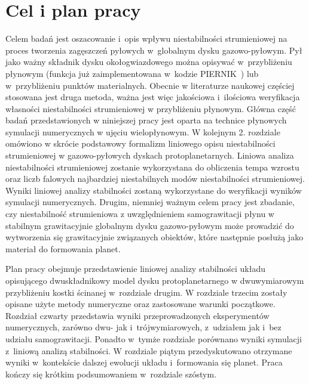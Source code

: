 \section{Cel i plan pracy}
Celem badań jest oszacowanie i~opis wpływu niestabilności strumieniowej na
proces tworzenia zagęszczeń pyłowych w~globalnym dysku gazowo-pyłowym.  Pył jako
ważny składnik dysku okołogwiazdowego można opisywać w~przybliżeniu płynowym
(funkcja już zaimplementowana w~kodzie \textsc{PIERNIK}~\cite{piernik2}) lub
w~przybliżeniu punktów materialnych. Obecnie w literaturze naukowej częściej
stosowana jest druga metoda, ważna jest więc jakościowa i~ilościowa weryfikacja
własności niestabilności strumieniowej w przybliżeniu płynowym.  Główna część
badań przedstawionych w niniejszej pracy jest oparta na technice płynowych
symulacji numerycznych w ujęciu wielopłynowym. W kolejnym 2. rozdziale omówiono
w skrócie podstawowy formalizm liniowego opisu niestabilności strumieniowej w
gazowo-pyłowych dyskach protoplanetarnych.  Liniowa analiza niestabilności
strumieniowej zostanie wykorzystana do obliczenia tempa wzrostu oraz liczb
falowych najbardziej niestabilnych modów niestabilności strumieniowej. Wyniki
liniowej analizy stabilności zostaną wykorzystane do weryfikacji wyników
symulacji numerycznych.  Drugim, niemniej ważnym celem pracy jest zbadanie, czy
niestabilność strumieniowa z uwzględnieniem samograwitacji płynu w stabilnym
grawitacyjnie globalnym dysku gazowo-pyłowym może prowadzić do wytworzenia się
grawitacyjnie związanych obiektów, które następnie posłużą jako materiał do
formowania planet.
\par Plan pracy obejmuje przedstawienie liniowej analizy stabilności układu
opisującego dwuskładnikowy model dysku protoplanetarnego w dwuwymiarowym
przybliżeniu kostki ścinanej w~rozdziale drugim. W rozdziale trzecim zostały
opisane użyte metody numeryczne oraz zastosowane warunki początkowe. Rozdział
czwarty przedstawia wyniki przeprowadzonych eksperymentów numerycznych, zarówno
dwu- jak i~trójwymiarowych, z~udziałem jak i~bez udziału samograwitacji. Ponadto
w~tymże rozdziale porównano wyniki symulacji z~liniową analizą stabilności. W
rozdziale piątym przedyskutowano otrzymane wyniki w~kontekście dalszej ewolucji
układu i~formowania się planet. Praca kończy się krótkim podsumowaniem
w~rozdziale szóstym.

